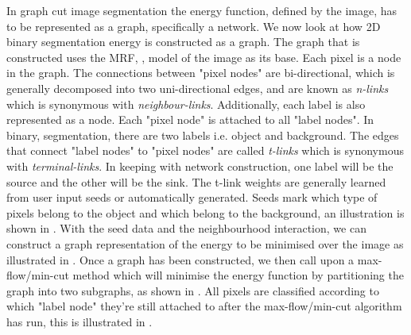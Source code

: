 In graph cut image segmentation the energy function, defined by the image, has to be represented as a graph, specifically a network. We now look at how 2D binary segmentation energy is constructed as a graph. The graph that is constructed uses the MRF, , model of the image as its base. Each pixel is a node in the graph. The connections between "pixel nodes" are bi-directional, which is generally decomposed into two uni-directional edges, and are known as \textit{n-links} which is synonymous with \textit{neighbour-links}. Additionally, each label is also represented as a node. Each "pixel node" is attached to all "label nodes". In binary, segmentation, there are two labels i.e. object and background. The edges that connect "label nodes" to "pixel nodes" are called \textit{t-links} which is synonymous with \textit{terminal-links}. In keeping with network construction, one label will be the source and the other will be the sink. The t-link weights are generally learned from user input seeds or automatically generated. Seeds mark which type of pixels belong to the object and which belong to the background, an illustration is shown in . With the seed data and the neighbourhood interaction, we can construct a graph representation of the energy to be minimised over the image as illustrated in . Once a graph has been constructed, we then call upon a max-flow/min-cut method which will minimise the energy function by partitioning the graph into two subgraphs, as shown in . All pixels are classified according to which "label node" they're still attached to after the max-flow/min-cut algorithm has run, this is illustrated in .

